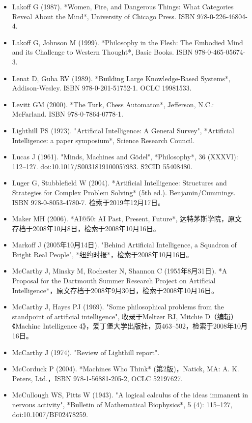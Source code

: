 \begin{itemize}
\item Lakoff G (1987). *Women, Fire, and Dangerous Things: What Categories Reveal About the Mind*, University of Chicago Press. ISBN 978-0-226-46804-4.  
\item Lakoff G, Johnson M (1999). *Philosophy in the Flesh: The Embodied Mind and its Challenge to Western Thought*, Basic Books. ISBN 978-0-465-05674-3.  
\item Lenat D, Guha RV (1989). *Building Large Knowledge-Based Systems*, Addison-Wesley. ISBN 978-0-201-51752-1. OCLC 19981533.  
\item Levitt GM (2000). *The Turk, Chess Automaton*, Jefferson, N.C.: McFarland. ISBN 978-0-7864-0778-1.
\item Lighthill PS (1973). "Artificial Intelligence: A General Survey", *Artificial Intelligence: a paper symposium*, Science Research Council.  
\item Lucas J (1961). "Minds, Machines and Gödel", *Philosophy*, 36 (XXXVI): 112–127. doi:10.1017/S0031819100057983. S2CID 55408480.  
\item Luger G, Stubblefield W (2004). *Artificial Intelligence: Structures and Strategies for Complex Problem Solving* (5th ed.). Benjamin/Cummings. ISBN 978-0-8053-4780-7. 检索于2019年12月17日。
\item Maker MH (2006). *AI@50: AI Past, Present, Future*, 达特茅斯学院，原文存档于2008年10月8日，检索于2008年10月16日。  
\item Markoff J (2005年10月14日). "Behind Artificial Intelligence, a Squadron of Bright Real People", *纽约时报*，检索于2008年10月16日。  
\item McCarthy J, Minsky M, Rochester N, Shannon C (1955年8月31日). *A Proposal for the Dartmouth Summer Research Project on Artificial Intelligence*，原文存档于2008年9月30日，检索于2008年10月16日。  
\item McCarthy J, Hayes PJ (1969). "Some philosophical problems from the standpoint of artificial intelligence", 收录于Meltzer BJ, Mitchie D（编辑）《Machine Intelligence 4》，爱丁堡大学出版社，页463–502，检索于2008年10月16日。
\item McCarthy J (1974). "Review of Lighthill report".  
\item McCorduck P (2004). *Machines Who Think* (第2版)，Natick, MA: A. K. Peters, Ltd.，ISBN 978-1-56881-205-2, OCLC 52197627.  
\item McCullough WS, Pitts W (1943). "A logical calculus of the ideas immanent in nervous activity", *Bulletin of Mathematical Biophysics*, 5 (4): 115–127, doi:10.1007/BF02478259.  

\end{itemize}
